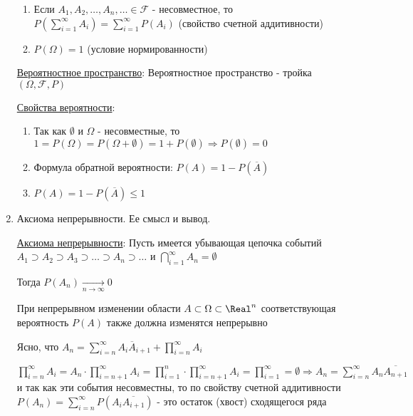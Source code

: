 \begin{enumerate}
\begin{enumerate}
        \item Если $A_1, A_2, \dots, A_n, \dots \in \mathcal{F}$ - несовместное, то $P(\sum_{i = 1}^\infty A_i) = \sum_{i = 1}^\infty P(A_i)$ (свойство счетной аддитивности)

        \item $P(\Omega) = 1$ (условие нормированности)
    \end{enumerate}

    \hyperlink{probabilityspace}{Вероятностное пространство}: Вероятностное пространство - тройка $(\Omega, \mathcal{F}, P)$

    \hyperlink{probabilityproperties}{Свойства вероятности}: 

    \begin{enumerate}
        \item Так как $\emptyset$ и $\Omega$ - несовместные, то $1 = P(\Omega) = P(\Omega + \emptyset) = 1 + P(\emptyset) \Longrightarrow P(\emptyset) = 0$

        \item Формула обратной вероятности: $P(A) = 1 - P(\overline{A})$

        \item $P(A) = 1 - P(\overline{A}) \leq 1$
    \end{enumerate}

    \item Аксиома непрерывности. Ее смысл и вывод.

    \hyperlink{continuityaxiom}{Аксиома непрерывности}: \Ths Пусть имеется убывающая цепочка событий $A_1 \supset A_2 \supset A_3 \supset \dots \supset A_n \supset \dots$ и $\bigcap_{i = 1}^\infty A_n = \emptyset$

    Тогда $P(A_n) \underset{n \to \infty}{\to} 0$

    При непрерывном изменении области $A \subset \Omega \subset \Real^n$ соответствующая вероятность $P(A)$ также должна изменятся непрерывно

    \begin{MyProof}
        Ясно, что $A_n = \sum_{i = n}^\infty A_i \overline{A}_{i + 1} + \prod_{i = n}^\infty A_i$

        $\prod_{i = n}^\infty A_i = A_n \cdot \prod_{i = n + 1}^\infty A_i = \prod_{i = 1}^n
        \cdot \prod_{i = n + 1}^\infty A_i = \prod_{i = 1}^\infty = \emptyset \Longrightarrow
        A_n = \sum_{i = n}^\infty A_n \overline{A_{n + 1}}$ и так как эти события несовместны,
        то по свойству счетной аддитивности $P(A_n) = \sum_{i = n}^\infty P(A_i \overline{A_{i + 1}})$ - это остаток (хвост) сходящегося ряда


\end{MyProof}
\end{enumerate}
